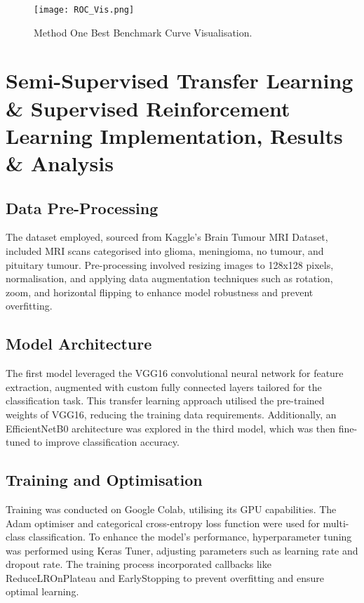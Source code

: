 \documentclass[conference]{IEEEtran}
\begin{document}
\begin{figure}[htbp]
    \centerline{\texttt{[image: ROC\_Vis.png]}}
    \caption{Method One Best Benchmark Curve Visualisation.}
    \label{fig}
\end{figure}

\section{Semi-Supervised Transfer Learning \& Supervised Reinforcement Learning Implementation, Results \& Analysis}

\subsection{Data Pre-Processing}
The dataset employed, sourced from Kaggle's Brain Tumour MRI Dataset, included MRI scans categorised into glioma, meningioma, no tumour, and pituitary tumour. Pre-processing involved resizing images to 128x128 pixels, normalisation, and applying data augmentation techniques such as rotation, zoom, and horizontal flipping to enhance model robustness and prevent overfitting.

\subsection{Model Architecture}
The first model leveraged the VGG16 convolutional neural network for feature extraction, augmented with custom fully connected layers tailored for the classification task. This transfer learning approach utilised the pre-trained weights of VGG16, reducing the training data requirements. Additionally, an EfficientNetB0 architecture was explored in the third model, which was then fine-tuned to improve classification accuracy.

\subsection{Training and Optimisation}
Training was conducted on Google Colab, utilising its GPU capabilities. The Adam optimiser and categorical cross-entropy loss function were used for multi-class classification. To enhance the model's performance, hyperparameter tuning was performed using Keras Tuner, adjusting parameters such as learning rate and dropout rate. The training process incorporated callbacks like ReduceLROnPlateau and EarlyStopping to prevent overfitting and ensure optimal learning.
\end{document}
